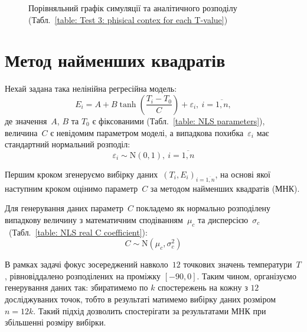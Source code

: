 \documentclass{mathreport}
\begin{document}
\begin{figure}[H]\centering
    \caption{Порівняльний графік симуляції та аналітичного розподілу (Табл.~\ref{table: Test 3: phisical contex for each T-value})}
    \label{pic: Test 3: phisical contex for each T-value}
\end{figure}

\newpage
\section{Метод найменших квадратів}

\setcounter{subsection}{2}
\setcounter{equation}{0}

Нехай задана така нелінійна регресійна модель:
\begin{equation}\label{eq: NLS energy intro}
    E_i = A + B\tanh{\left( \frac{T_i-T_0}{C} \right)} + \varepsilon_i,\ i=\overline{1,n},
\end{equation}
де значення~$A$, $B$ та $T_0$ є фіксованими (Табл.~\ref{table: NLS parameters}), величина~$C$ є невідомим параметром моделі, а випадкова похибка~$\varepsilon_i$ має стандартний нормальний розподіл:
\begin{equation}\label{eq: NLS error distribution}
    \varepsilon_i \sim \mathrm{N}(0,1),\ i=\overline{1,n}
\end{equation}

Першим кроком згенеруємо вибірку даних~$\left( T_i, E_i \right)_{i=\overline{1,n}}$, на основі якої наступним кроком оцінимо параметр~$C$ за методом найменших квадратів (МНК).

Для генерування даних параметр~$C$ покладемо як нормально розподілену випадкову величину з математичним сподіванням~$\mu_c$ та дисперсією~$\sigma_c$~(Табл.~\ref{table: NLS real C coefficient}):
\begin{equation}\label{eq: NLS real C coefficien distribution}
    C \sim \mathrm{N}(\mu_c,\sigma_c^2)
\end{equation}

В рамках задачі фокус зосереджений навколо~$12$ точкових значень температури~$T$, рівновіддалено розподілених на проміжку $[-90,0]$. Таким чином, організуємо генерування даних так: збиратимемо по $k$ спостережень на кожну з $12$ досліджуваних точок, тобто в результаті матимемо вибірку даних розміром~$n=12k$. Такий підхід дозволить спостерігати за результатами МНК при збільшенні розміру вибірки.
\end{document}
